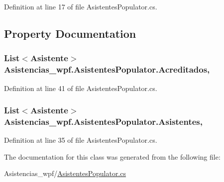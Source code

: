 Definition at line 17 of file Asistentes\-Populator.\-cs.



\subsection{Property Documentation}
\hypertarget{class_asistencias__wpf_1_1_asistentes_populator_a5db01c3b8b78cd44c75180c2450db2c5}{
\subsubsection[{Acreditados}]{\setlength{\rightskip}{0pt plus 5cm}List$<${\bf Asistente}$>$ Asistencias\-\_\-wpf.\-Asistentes\-Populator.\-Acreditados\hspace{0.3cm}{\ttfamily [get]}, {\ttfamily [set]}}}\label{class_asistencias__wpf_1_1_asistentes_populator_a5db01c3b8b78cd44c75180c2450db2c5}


Definition at line 41 of file Asistentes\-Populator.\-cs.

\hypertarget{class_asistencias__wpf_1_1_asistentes_populator_aabced42abbc527d1a0426c3772546eca}{
\subsubsection[{Asistentes}]{\setlength{\rightskip}{0pt plus 5cm}List$<${\bf Asistente}$>$ Asistencias\-\_\-wpf.\-Asistentes\-Populator.\-Asistentes\hspace{0.3cm}{\ttfamily [get]}, {\ttfamily [set]}}}\label{class_asistencias__wpf_1_1_asistentes_populator_aabced42abbc527d1a0426c3772546eca}


Definition at line 35 of file Asistentes\-Populator.\-cs.



The documentation for this class was generated from the following file\-:\begin{DoxyCompactItemize}
\item 
Asistencias\-\_\-wpf/\hyperlink{_asistentes_populator_8cs}{Asistentes\-Populator.\-cs}\end{DoxyCompactItemize}
